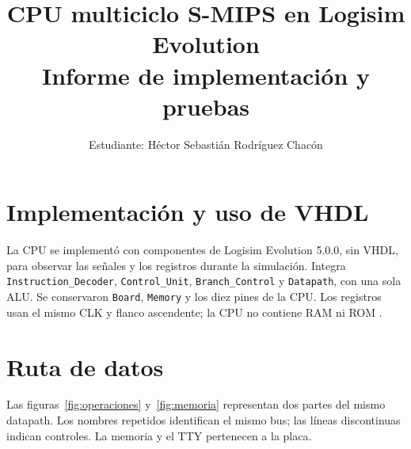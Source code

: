 \documentclass[11pt,a4paper]{article}
\title{CPU multiciclo S-MIPS en Logisim Evolution\\[4pt]\large Informe de implementación y pruebas}
\author{Estudiante: Héctor Sebastián Rodríguez Chacón\\[5pt]\normalsize\curso}
\date{}
\newcommand{\sig}[1]{\texttt{#1}}
\begin{document}
\maketitle

\section{Implementación y uso de VHDL}

La CPU se implementó con componentes de Logisim Evolution 5.0.0, sin VHDL,
para observar las señales y los registros durante la simulación. Integra
\sig{Instruction\_Decoder}, \sig{Control\_Unit}, \sig{Branch\_Control} y
\sig{Datapath}, con una sola ALU. Se conservaron \sig{Board}, \sig{Memory}
y los diez pines de la CPU. Los registros usan el mismo CLK y flanco ascendente;
la CPU no contiene RAM ni ROM \cite{guia,circuito}.

\section{Ruta de datos}

Las figuras~\ref{fig:operaciones} y~\ref{fig:memoria} representan dos partes
del mismo datapath. Los nombres repetidos identifican el mismo bus; las líneas
discontinuas indican controles. La memoria y el TTY pertenecen a la placa.
\end{document}
